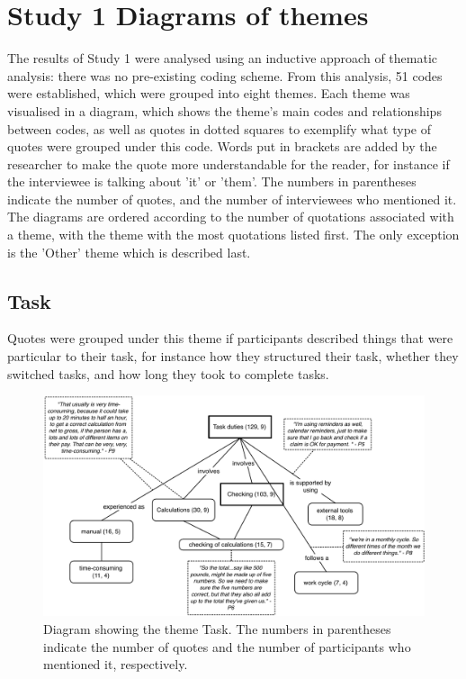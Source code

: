 \chapter{Study 1 Diagrams of themes}\label{ch:S1_Diagrams}
The results of Study 1 were analysed using an inductive approach of thematic analysis: there was no pre-existing coding scheme. From this analysis, 51 codes were established, which were grouped into eight themes. Each theme was visualised in a diagram, which shows the theme's main codes and relationships between codes, as well as quotes in dotted squares to exemplify what type of quotes were grouped under this code. Words put in brackets are added by the researcher to make the quote more understandable for the reader, for instance if the interviewee is talking about 'it' or 'them'. The numbers in parentheses indicate the number of quotes, and the number of interviewees who mentioned it. The diagrams are ordered according to the number of quotations associated with a theme, with the theme with the most quotations listed first. The only exception is the 'Other' theme which is described last.

\newpage

\section{Task}
Quotes were grouped under this theme if participants described things that were particular to their task, for instance how they structured their task, whether they switched tasks, and how long they took to complete tasks.

\begin{figure}[!ht]
\centering
\includegraphics[width=\textwidth]{images/ch12/Task.pdf}
\caption[Study 1 Task diagram]{Diagram showing the theme Task. The numbers in parentheses indicate the number of quotes and the number of participants who mentioned it, respectively.}
\vspace{-9pt}
\label{fig:ch3_task}
\end{figure}

